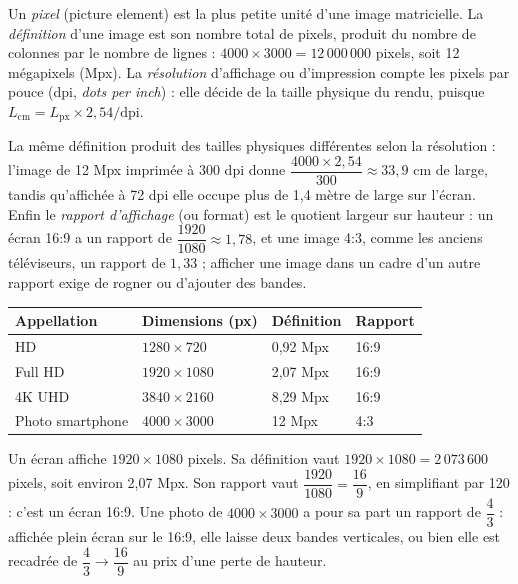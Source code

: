 \begin{definition}
Un \emph{pixel} (picture element) est la plus petite unité d'une image matricielle. La \emph{définition} d'une image est son nombre total de pixels, produit du nombre de colonnes par le nombre de lignes : $4000 \times 3000 = 12\,000\,000$ pixels, soit 12 mégapixels (Mpx). La \emph{résolution} d'affichage ou d'impression compte les pixels par pouce (dpi, \emph{dots per inch}) : elle décide de la taille physique du rendu, puisque $L_{\text{cm}} = L_{\text{px}} \times 2{,}54 / \text{dpi}$.
\end{definition}

La même définition produit des tailles physiques différentes selon la résolution : l'image de 12 Mpx imprimée à 300 dpi donne $\dfrac{4000 \times 2{,}54}{300} \approx 33{,}9$ cm de large, tandis qu'affichée à 72 dpi elle occupe plus de 1,4 mètre de large sur l'écran. Enfin le \emph{rapport d'affichage} (ou format) est le quotient largeur sur hauteur : un écran 16:9 a un rapport de $\dfrac{1920}{1080} \approx 1{,}78$, et une image 4:3, comme les anciens téléviseurs, un rapport de $1{,}33$ ; afficher une image dans un cadre d'un autre rapport exige de rogner ou d'ajouter des bandes.

\begin{center}
\small
\begin{tabular}{L{3.4cm}C{3.2cm}C{2.6cm}C{2.4cm}}
\toprule
{}\textbf{Appellation} & \textbf{Dimensions (px)} & \textbf{Définition} & \textbf{Rapport}\\
\midrule
HD & $1280 \times 720$ & 0,92 Mpx & 16:9\\
Full HD & $1920 \times 1080$ & 2,07 Mpx & 16:9\\
4K UHD & $3840 \times 2160$ & 8,29 Mpx & 16:9\\
Photo smartphone & $4000 \times 3000$ & 12 Mpx & 4:3\\
\bottomrule
\end{tabular}
\label{ch6:tab:definitions}
\end{center}

\begin{exemple}
Un écran affiche $1920 \times 1080$ pixels. Sa définition vaut $1920 \times 1080 = 2\,073\,600$ pixels, soit environ 2{,}07 Mpx. Son rapport vaut $\dfrac{1920}{1080} = \dfrac{16}{9}$, en simplifiant par 120 : c'est un écran 16:9. Une photo de $4000 \times 3000$ a pour sa part un rapport de $\dfrac{4}{3}$ : affichée plein écran sur le 16:9, elle laisse deux bandes verticales, ou bien elle est recadrée de $\dfrac{4}{3} \to \dfrac{16}{9}$ au prix d'une perte de hauteur.
\end{exemple}

